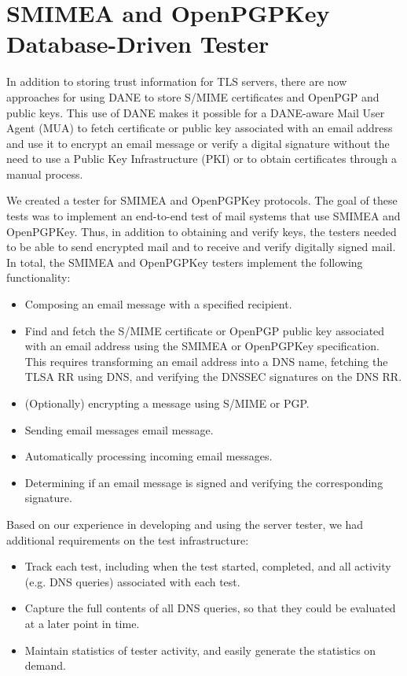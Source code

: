 \documentclass[preprint,3p,11pt]{elsarticle}
\begin{document}
\section{SMIMEA and OpenPGPKey Database-Driven Tester}
In addition to storing trust information for TLS servers, there are
now approaches for using DANE to store S/MIME certificates and OpenPGP
and public keys. This use of DANE makes it possible for a DANE-aware
Mail User Agent (MUA) to fetch certificate or public key associated
with an email address and use it to encrypt an email message or verify
a digital signature without the need to use a Public Key
Infrastructure (PKI) or to obtain certificates through a manual
process.

We created a tester for SMIMEA and OpenPGPKey protocols. The goal of
these tests was to implement an end-to-end test of mail systems that
use SMIMEA and OpenPGPKey. Thus, in addition to obtaining and verify
keys, the testers needed to be able to send encrypted mail and to
receive and verify digitally signed mail. In total, the 
SMIMEA and OpenPGPKey testers implement the following functionality:

\begin{itemize}
\item Composing an email message with a specified recipient. 
\item Find and fetch the S/MIME certificate or OpenPGP public
  key associated with an email address using the SMIMEA or OpenPGPKey
  specification. This requires transforming an email address into a
  DNS name, fetching the TLSA RR using DNS, and verifying the DNSSEC
  signatures on the DNS RR.
\item (Optionally) encrypting a message using S/MIME or PGP.
\item Sending email messages email message. 
\item Automatically processing incoming email messages.
\item Determining if an email message is signed and verifying the
  corresponding signature. 
\end{itemize}

\noindent Based on our experience in developing and using the server tester, we
had additional requirements on the test infrastructure:

\begin{itemize}
\item Track each test, including when the test started, completed, and
  all activity (e.g. DNS queries) associated with each test.
\item Capture the full contents of all DNS queries, so that they could
  be evaluated at a later point in time.
\item Maintain statistics of tester activity, and easily generate the
  statistics on demand.
\end{itemize}
\end{document}
